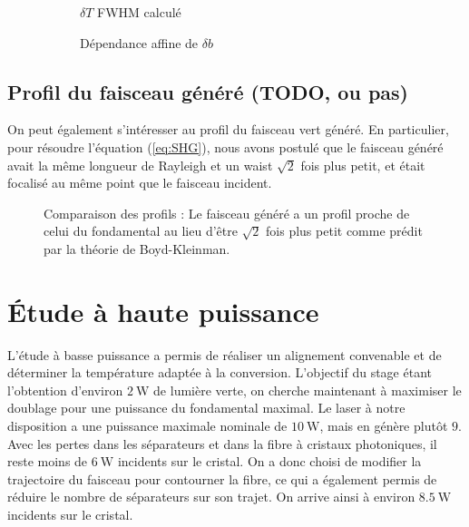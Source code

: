 \documentclass[11pt,a4paper] { article}
\newcommand{\zr}{z_\mathsc{R}}
\newcommand{\mathsc}[1]{\mathrm{\scriptscriptstyle {#1}}}
\begin{document}

\begin{figure}[htpb] 
\centering
\begin{subfigure}[b]{0.48\textwidth}
	\small
	
	\vspace{-0.42cm}
	\caption{$\delta T$ FWHM calculé}
	\label{fig:fwhm}
\end{subfigure}
\hspace{0.2cm}
\begin{subfigure}[b]{0.48\textwidth}
	\small
	
	\caption{Dépendance affine de $\delta b$}
	\label{fig:baff}
\end{subfigure}
\hspace{0.8cm}
\caption{}
\end{figure}


\subsection{Profil du faisceau généré (TODO, ou pas)} 

On peut également s'intéresser au profil du faisceau vert généré. En particulier, pour résoudre l'équation (\ref{eq:SHG}), nous avons postulé que le faisceau généré avait la même longueur de Rayleigh et un waist $\sqrt 2$ fois plus petit, et était focalisé au même point que le faisceau incident. 

\begin{figure}[h]  
	\centering
	
	\caption{Comparaison des profils : \small Le faisceau généré a un profil proche de celui du fondamental au lieu d'être $\sqrt2$ fois plus petit comme prédit par la théorie de Boyd-Kleinman.} %
	\label{fig:vert}
\end{figure}


\section{Étude à haute puissance}

L'étude à basse puissance a permis de réaliser un alignement convenable et de déterminer la température adaptée à la conversion. L'objectif du stage étant l'obtention d'environ $\SI{2}{\watt}$ de lumière verte, on cherche maintenant à maximiser le doublage pour une puissance du fondamental maximal. Le laser à notre disposition a une puissance maximale nominale de $\SI{10}{\watt}$, mais en génère plutôt $9$. Avec les pertes dans les séparateurs et dans la fibre à cristaux photoniques, il reste moins de $\SI{6}{\watt}$ incidents sur le cristal. On a donc choisi de modifier la trajectoire du faisceau pour contourner la fibre, ce qui a également permis de réduire le nombre de séparateurs sur son trajet. On arrive ainsi à environ $\SI{8.5}{\watt}$ incidents sur le cristal. 
\end{document}
